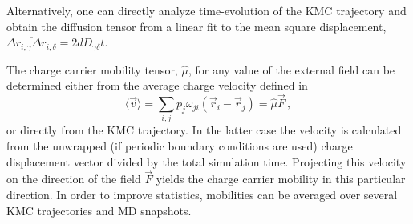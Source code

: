 Alternatively, one can directly analyze time-evolution of the KMC trajectory and obtain the diffusion tensor from a linear fit to the mean square displacement, $\overline{ \Delta{r}_{i, \gamma} \Delta{r}_{i, \delta}} = 2d D_{\gamma \delta} t$. 

The charge carrier mobility tensor, $\hat{\mu}$, for any value of the external field can be determined either from the average charge velocity defined in
\begin{equation}
 \langle \vec{v} \rangle =  \sum_{i,j}  p_j  \omega_{ji}  (\vec{r}_i - \vec{r}_j) = \hat{\mu} \vec{F} \, ,
\end{equation}
or directly from the KMC trajectory. In the latter case the velocity is calculated from the unwrapped (if periodic boundary conditions are used) charge displacement vector divided by the total simulation time. Projecting this velocity on the direction of the field $\vec{F}$ yields the charge carrier mobility in this particular direction. In order to improve statistics, mobilities can be averaged over several KMC trajectories and MD snapshots.
